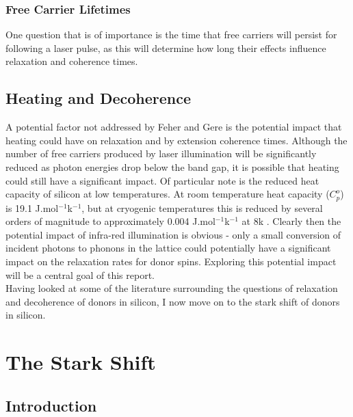 \subsubsection{Free Carrier Lifetimes}

One question that is of importance is the time that free carriers will persist for following a laser pulse, as this will determine how long their effects influence relaxation and coherence times.

\subsection{Heating and Decoherence}

A potential factor not addressed by Feher and Gere is the potential impact that heating could have on relaxation and by extension coherence times. 
Although the number of free carriers produced by laser illumination will be significantly reduced as photon energies drop below the band gap, it is possible that heating could still have a significant impact.
Of particular note is the reduced heat capacity of silicon at low temperatures. 
At room temperature heat capacity ($C_p^o$) is 19.1 J.mol$^{-1}$k$^{-1}$, but at cryogenic temperatures this is reduced by several orders of magnitude to approximately 0.004 J.mol$^{-1}$k$^{-1}$ at 8k \cite{Desai1986,Niinikoski1986}.
Clearly then the potential impact of infra-red illumination is obvious - only a small conversion of incident photons to phonons in the lattice could potentially have a significant impact on the relaxation rates for donor spins.
Exploring this potential impact will be a central goal of this report.
\\
Having looked at some of the literature surrounding the questions of relaxation and decoherence of donors in silicon, I now move on to the stark shift of donors in silicon.

\section{The Stark Shift}

\subsection{Introduction}


